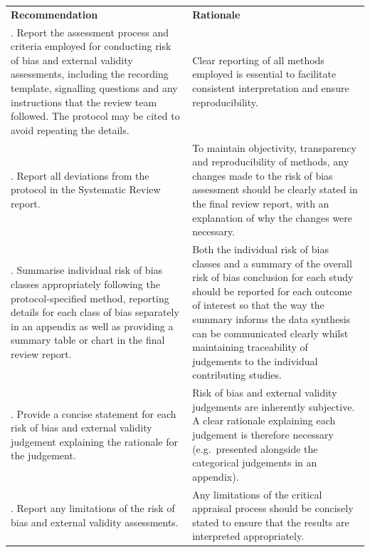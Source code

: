 \documentclass[
  letterpaper,
  DIV=11,
  numbers=noendperiod]{scrreprt}
\newcounter{none} %
\begin{document}
{\def\LTcaptype{none} %
\begin{longtable}[]{@{}
  >{\raggedright\arraybackslash}p{}
  >{\raggedright\arraybackslash}p{}@{}}
\toprule\noalign{}
\endhead
\bottomrule\noalign{}
\endlastfoot
\textbf{Recommendation} & \textbf{Rationale} \\
1. Report the assessment process and criteria employed for conducting
risk of bias and external validity assessments, including the recording
template, signalling questions and any instructions that the review team
followed. The protocol may be cited to avoid repeating the details. &
Clear reporting of all methods employed is essential to facilitate
consistent interpretation and ensure reproducibility. \\
2. Report all deviations from the protocol in the Systematic Review
report. & To maintain objectivity, transparency and reproducibility of
methods, any changes made to the risk of bias assessment should be
clearly stated in the final review report, with an explanation of why
the changes were necessary. \\
3. Summarise individual risk of bias classes appropriately following the
protocol-specified method, reporting details for each class of bias
separately in an appendix as well as providing a summary table or chart
in the final review report. & Both the individual risk of bias classes
and a summary of the overall risk of bias conclusion for each study
should be reported for each outcome of interest so that the way the
summary informs the data synthesis can be communicated clearly whilst
maintaining traceability of judgements to the individual contributing
studies. \\
4. Provide a concise statement for each risk of bias and external
validity judgement explaining the rationale for the judgement. & Risk of
bias and external validity judgements are inherently subjective. A clear
rationale explaining each judgement is therefore necessary
(e.g.~presented alongside the categorical judgements in an appendix). \\
5. Report any limitations of the risk of bias and external validity
assessments. & Any limitations of the critical appraisal process should
be concisely stated to ensure that the results are interpreted
appropriately. \\
\end{longtable}
}

\end{document}
